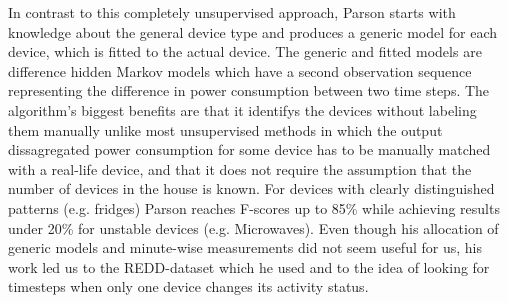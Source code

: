 \documentclass{article}
\begin{document}
In contrast to this completely unsupervised approach, Parson starts with knowledge about the general device type and 
produces a generic model for each device, which is fitted to the actual device. The generic and fitted models are difference hidden Markov models which have a second observation sequence representing the difference in power consumption between two time steps. The algorithm's biggest benefits are that it identifys the 
devices without labeling them manually unlike most unsupervised methods in which the output dissagregated power consumption for some device has to be manually matched with a real-life device, and that it does not require the assumption that the number of devices in the house is known. For devices with clearly distinguished patterns 
(e.g. fridges) Parson reaches F-scores up to 85\% while achieving results under 20\% for unstable devices (e.g. Microwaves).
Even though his allocation of generic models and minute-wise measurements did not seem useful for us, his work led 
us to the REDD-dataset which he used
and to the idea of looking for timesteps when only one device changes its activity status.





\end{document}

